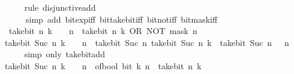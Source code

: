 \begin{isabellebody}
\ \ \ \ \isamarkupfalse%
\ {\isacharparenleft}{\kern0pt}rule\ disjunctive{\isacharunderscore}{\kern0pt}add{\isacharparenright}{\kern0pt}\isanewline
\ \ \ \ \ \ {\isacharparenleft}{\kern0pt}simp\ add{\isacharcolon}{\kern0pt}\ bit{\isacharunderscore}{\kern0pt}exp{\isacharunderscore}{\kern0pt}iff\ bit{\isacharunderscore}{\kern0pt}take{\isacharunderscore}{\kern0pt}bit{\isacharunderscore}{\kern0pt}iff\ bit{\isacharunderscore}{\kern0pt}not{\isacharunderscore}{\kern0pt}iff\ bit{\isacharunderscore}{\kern0pt}mask{\isacharunderscore}{\kern0pt}iff{\isacharparenright}{\kern0pt}\isanewline
\ \ \isamarkupfalse%
\ \isamarkupfalse%
\ {\isacharasterisk}{\kern0pt}{\isacharasterisk}{\kern0pt}{\isacharcolon}{\kern0pt}\ {\isacartoucheopen}take{\isacharunderscore}{\kern0pt}bit\ n\ k\ {\isacharminus}{\kern0pt}\ {}\ {\isacharcircum}{\kern0pt}\ n\ {\isacharequal}{\kern0pt}\ take{\isacharunderscore}{\kern0pt}bit\ n\ k\ OR\ NOT\ {\isacharparenleft}{\kern0pt}mask\ n{\isacharparenright}{\kern0pt}{\isacartoucheclose}\ \isacommand{{\isachardot}{\kern0pt}}\isamarkupfalse%
\isanewline
\ \ \isamarkupfalse%
\ {\isacartoucheopen}take{\isacharunderscore}{\kern0pt}bit\ {\isacharparenleft}{\kern0pt}Suc\ n{\isacharparenright}{\kern0pt}\ {\isacharparenleft}{\kern0pt}k\ {\isacharplus}{\kern0pt}\ {}\ {\isacharcircum}{\kern0pt}\ n{\isacharparenright}{\kern0pt}\ {\isacharequal}{\kern0pt}\ take{\isacharunderscore}{\kern0pt}bit\ {\isacharparenleft}{\kern0pt}Suc\ n{\isacharparenright}{\kern0pt}\ {\isacharparenleft}{\kern0pt}take{\isacharunderscore}{\kern0pt}bit\ {\isacharparenleft}{\kern0pt}Suc\ n{\isacharparenright}{\kern0pt}\ k\ {\isacharplus}{\kern0pt}\ take{\isacharunderscore}{\kern0pt}bit\ {\isacharparenleft}{\kern0pt}Suc\ n{\isacharparenright}{\kern0pt}\ {\isacharparenleft}{\kern0pt}{}\ {\isacharcircum}{\kern0pt}\ n{\isacharparenright}{\kern0pt}{\isacharparenright}{\kern0pt}{\isacartoucheclose}\isanewline
\ \ \ \ \isamarkupfalse%
\ {\isacharparenleft}{\kern0pt}simp\ only{\isacharcolon}{\kern0pt}\ take{\isacharunderscore}{\kern0pt}bit{\isacharunderscore}{\kern0pt}add{\isacharparenright}{\kern0pt}\isanewline
\ \ \isamarkupfalse%
\ \isamarkupfalse%
\ {\isacartoucheopen}take{\isacharunderscore}{\kern0pt}bit\ {\isacharparenleft}{\kern0pt}Suc\ n{\isacharparenright}{\kern0pt}\ k\ {\isacharequal}{\kern0pt}\ {}\ {\isacharcircum}{\kern0pt}\ n\ {\isacharasterisk}{\kern0pt}\ of{\isacharunderscore}{\kern0pt}bool\ {\isacharparenleft}{\kern0pt}bit\ k\ n{\isacharparenright}{\kern0pt}\ {\isacharplus}{\kern0pt}\ take{\isacharunderscore}{\kern0pt}bit\ n\ k{\isacartoucheclose}\isanewline

\end{isabellebody}

